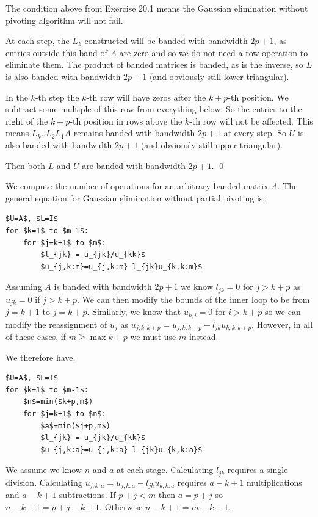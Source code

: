\documentclass[10pt]{article}
\begin{document}
\begin{solution}[Solution]
The condition above from Exercise 20.1 means the Gaussian elimination without pivoting algorithm will not fail. 

At each step, the \( L_k \) constructed will be banded with bandwidth \( 2p+1 \), as entries outside this band of \( A \) are zero and so we do not need a row operation to eliminate them. The product of banded matrices is banded, as is the inverse, so \( L \) is also banded with bandwidth \( 2p+1 \) (and obviously still lower triangular).

In the \( k \)-th step the \( k \)-th row will have zeros after the \( k+p \)-th position. We subtract some multiple of this row from everything below. So the entries to the right of the \( k+p \)-th position in rows above the \( k \)-th row will not be affected. This means \( L_k..L_2L_1A \) remains banded with bandwidth \( 2p+1 \) at every step. So \( U \) is also banded with bandwidth \( 2p+1 \) (and obviously still upper triangular).

Then both \( L \) and \( U \) are banded with bandwidth \( 2p+1 \). \qed

We compute the number of operations for an arbitrary banded matrix \( A \). The general equation for Gaussian elimination without partial pivoting is:
\begin{lstlisting}[mathescape=true]
$U=A$, $L=I$
for $k=1$ to $m-1$:
    for $j=k+1$ to $m$:
        $l_{jk} = u_{jk}/u_{kk}$
        $u_{j,k:m}=u_{j,k:m}-l_{jk}u_{k,k:m}$
\end{lstlisting}

Assuming \( A \) is banded with bandwidth \( 2p+1 \) we know \( l_{jk} = 0 \) for \( j>k+p \) as \( u_{jk} = 0 \) if \( j > k+p \). We can then modify the bounds of the inner loop to be from \( j=k+1 \) to \( j=k+p \). Similarly, we know that \( u_{k,i} = 0 \) for \( i > k+p \) so we can modify the reassignment of \( u_j \) as \( u_{j,k:k+p} = u_{j,k:k+p} - l_{jk}u_{k,k:k+p} \). However, in all of these cases, if \( m\geq \max{k+p} \) we must use \( m \) instead.

We therefore have,
\begin{lstlisting}[mathescape=true]
$U=A$, $L=I$
for $k=1$ to $m-1$:
    $n$=min($k+p,m$)
    for $j=k+1$ to $n$:
        $a$=min($j+p,m$)
        $l_{jk} = u_{jk}/u_{kk}$
        $u_{j,k:a}=u_{j,k:a}-l_{jk}u_{k,k:a}$
\end{lstlisting}

We assume we know \( n \) and \( a \) at each stage. Calculating \( l_{jk} \) requires a single division. Calculating \( u_{j,k:a}=u_{j,k:a}-l_{jk}u_{k,k:a} \) requires \( a-k+1 \) multiplications and \( a-k+1 \) subtractions. If \( p+j < m \) then \( a=p+j \) so \( n-k+1 = p+j-k+1 \). Otherwise \( n-k+1 = m-k+1 \).


\end{solution}
\end{document}
